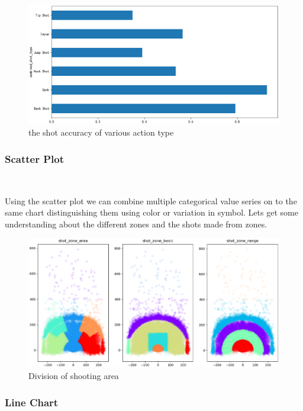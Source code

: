 \begin{figure}[H]
			\centering
		\includegraphics[scale=0.3]{f.eps
		}        %
		\caption{the shot accuracy of various action type}
		\label{fig3}

\end{figure}
\newpage

\subsubsection{Scatter Plot}
\

Using the scatter plot we can combine multiple 
categorical value series on to the same chart distinguishing them using color or 
variation in symbol.
Lets get some understanding about the different zones and the shots made from zones.
\begin{figure}[H]
		\centering
	\includegraphics[scale=0.3]{h.eps
	}        %
	\caption{Division of shooting area}
	\label{fig4}

\end{figure}

\subsubsection{Line Chart}
\

